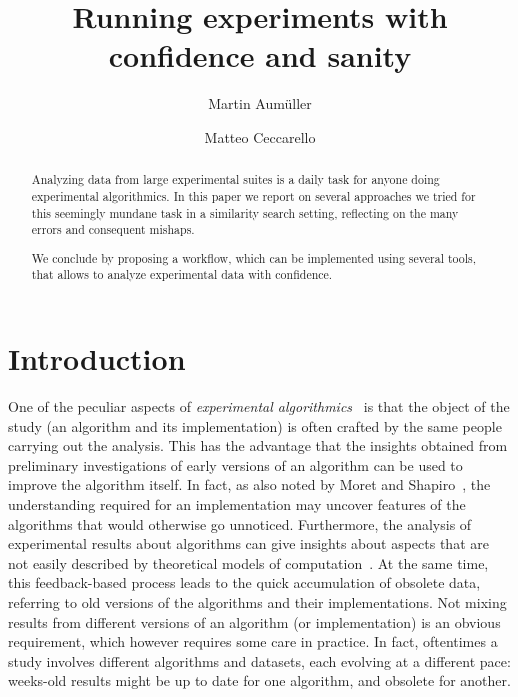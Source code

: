 \documentclass{llncs}
\begin{document}
\title{Running experiments with confidence and sanity}
%
%
\author{
  Martin Aumüller%
  \and
  Matteo Ceccarello%
  }
%
%
%
\maketitle              %
%
\begin{abstract}
Analyzing data from large experimental suites is a daily task for
anyone doing experimental algorithmics.
In this paper we report on several approaches we tried for this 
seemingly mundane task in a similarity search setting, reflecting on the many errors and consequent
mishaps.

We conclude by proposing a workflow, which can be implemented using several
tools, that allows to analyze experimental data with confidence.

\end{abstract}

\section{Introduction}

One of the peculiar aspects of \emph{experimental algorithmics}~\cite{DBLP:conf/dimacs/Moret99}
is that the object of the study (an algorithm and its implementation)
is often crafted by the same people carrying out the analysis.
This has the advantage that the insights obtained from preliminary
investigations of early versions of an algorithm can be used to improve the
algorithm itself.
In fact, as also noted by Moret and Shapiro~\cite{DBLP:journals/jucs/MoretS01},
the understanding required for an implementation may uncover features of the
algorithms that would otherwise go unnoticed.
Furthermore, the analysis of experimental results about algorithms can give
insights about aspects that are not easily described by theoretical
models of computation~\cite{DBLP:journals/cacm/McGeoch07}.
At the same time, this feedback-based process leads to the quick
accumulation of obsolete data, referring to old versions of the
algorithms and their implementations.
Not mixing results from different versions of
an algorithm (or implementation) is an obvious requirement, which
however requires some care in practice.
In fact, oftentimes a study involves different algorithms and datasets,
each evolving at a different pace: weeks-old results might be up to date
for one algorithm, and obsolete for another.
\end{document}
